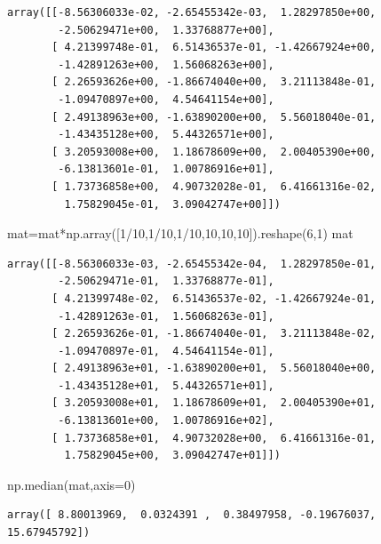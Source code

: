 \documentclass[
  letterpaper,
  DIV=11,
  numbers=noendperiod]{scrreprt}
\newenvironment{Shaded}{\begin{snugshade}}{\end{snugshade}}
\newcommand{\DecValTok}[1]{\textcolor[rgb]{0.68,0.00,0.00}{#1}}
\newcommand{\NormalTok}[1]{\textcolor[rgb]{0.00,0.23,0.31}{#1}}
\newcommand{\OperatorTok}[1]{\textcolor[rgb]{0.37,0.37,0.37}{#1}}
\begin{document}
\begin{verbatim}
array([[-8.56306033e-02, -2.65455342e-03,  1.28297850e+00,
        -2.50629471e+00,  1.33768877e+00],
       [ 4.21399748e-01,  6.51436537e-01, -1.42667924e+00,
        -1.42891263e+00,  1.56068263e+00],
       [ 2.26593626e+00, -1.86674040e+00,  3.21113848e-01,
        -1.09470897e+00,  4.54641154e+00],
       [ 2.49138963e+00, -1.63890200e+00,  5.56018040e-01,
        -1.43435128e+00,  5.44326571e+00],
       [ 3.20593008e+00,  1.18678609e+00,  2.00405390e+00,
        -6.13813601e-01,  1.00786916e+01],
       [ 1.73736858e+00,  4.90732028e-01,  6.41661316e-02,
         1.75829045e-01,  3.09042747e+00]])
\end{verbatim}

\begin{Shaded}
\begin{Highlighting}[]
\NormalTok{mat}\OperatorTok{=}\NormalTok{mat}\OperatorTok{*}\NormalTok{np.array([}\DecValTok{1}\OperatorTok{/}\DecValTok{10}\NormalTok{,}\DecValTok{1}\OperatorTok{/}\DecValTok{10}\NormalTok{,}\DecValTok{1}\OperatorTok{/}\DecValTok{10}\NormalTok{,}\DecValTok{10}\NormalTok{,}\DecValTok{10}\NormalTok{,}\DecValTok{10}\NormalTok{]).reshape(}\DecValTok{6}\NormalTok{,}\DecValTok{1}\NormalTok{)}
\NormalTok{mat}
\end{Highlighting}
\end{Shaded}

\begin{verbatim}
array([[-8.56306033e-03, -2.65455342e-04,  1.28297850e-01,
        -2.50629471e-01,  1.33768877e-01],
       [ 4.21399748e-02,  6.51436537e-02, -1.42667924e-01,
        -1.42891263e-01,  1.56068263e-01],
       [ 2.26593626e-01, -1.86674040e-01,  3.21113848e-02,
        -1.09470897e-01,  4.54641154e-01],
       [ 2.49138963e+01, -1.63890200e+01,  5.56018040e+00,
        -1.43435128e+01,  5.44326571e+01],
       [ 3.20593008e+01,  1.18678609e+01,  2.00405390e+01,
        -6.13813601e+00,  1.00786916e+02],
       [ 1.73736858e+01,  4.90732028e+00,  6.41661316e-01,
         1.75829045e+00,  3.09042747e+01]])
\end{verbatim}

\begin{Shaded}
\begin{Highlighting}[]
\NormalTok{np.median(mat,axis}\OperatorTok{=}\DecValTok{0}\NormalTok{)}
\end{Highlighting}
\end{Shaded}

\begin{verbatim}
array([ 8.80013969,  0.0324391 ,  0.38497958, -0.19676037, 15.67945792])
\end{verbatim}
\end{document}
